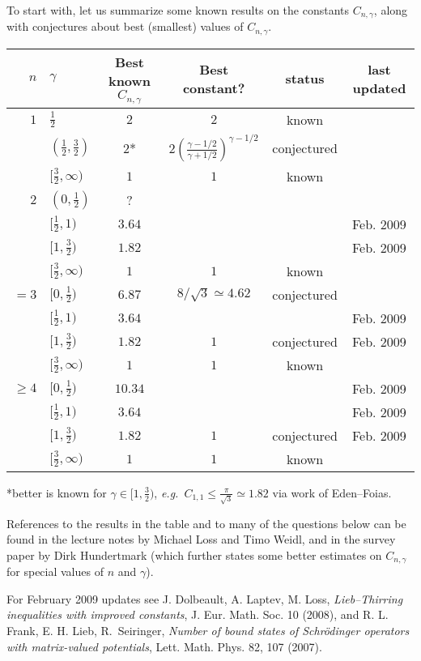 \documentclass[12pt,letterpaper, reqno]{aimpl}
\begin{document}
To start with, let us summarize some known results on the constants
$C_{n,\gamma}$, along with conjectures about best (smallest) values
of $C_{n,\gamma}$.
%
\begin{center}
%
\renewcommand{\arraystretch}{1.3}
\begin{tabular}[h]{|r|l|c|cc|c|}
\hline $n$ & $\gamma$ & Best known $C_{n,\gamma}$ & Best constant? & status & last updated\\
\hline \hline
$1$ & $\frac{1}{2}$ & $2$ & $2$ & known & \\
& $(\frac{1}{2},\frac{3}{2})$ & $2$* & $2 \! \left( \frac{\gamma - 1/2}{\gamma + 1/2} \right)^{\gamma - 1/2}$ & conjectured & \\
& $[\frac{3}{2},\infty)$ & $1$ & $1$ & known & \\
\hline
$2$ & $(0,\frac{1}{2})$ & ? & & &\\
& $[\frac{1}{2},1)$ & $3.64$ & & & Feb. 2009\\
& $[1,\frac{3}{2})$ & $1.82$ & & & Feb. 2009\\
& $[\frac{3}{2},\infty)$ & $1$ & $1$ & known &\\
\hline
$= 3$ & $[0,\frac{1}{2})$ & $6.87$ & $8/\sqrt{3}\simeq 4.62$ & conjectured &\\
& $[\frac{1}{2},1)$ & $3.64$ & & & Feb. 2009\\
& $[1,\frac{3}{2})$ & $1.82$ & $1$ & conjectured & Feb. 2009\\
& $[\frac{3}{2},\infty)$ & $1$ & $1$ & known & \\
\hline
$\geq 4$ & $[0,\frac{1}{2})$ & $10.34$ & & & Feb. 2009\\
& $[\frac{1}{2},1)$ & $3.64$ & & & Feb. 2009\\
& $[1,\frac{3}{2})$ & $1.82$ & $1$ & conjectured & Feb. 2009\\
& $[\frac{3}{2},\infty)$ & $1$ & $1$ & known & \\
\hline
\end{tabular}
%
\hspace*{0.5in} *better is known for $\gamma \in [1,\frac{3}{2})$,
\textit{e.g.}\ $C_{1,1} \leq \frac{\pi}{\sqrt{3}} \simeq 1.82$ via
work of Eden--Foias.
\end{center}
%
References to the results in the table and
to many of the questions below can be found in the lecture notes by
Michael Loss and Timo Weidl, and in the survey paper by Dirk
Hundertmark (which further states some better estimates on
$C_{n,\gamma}$ for special values of $n$ and $\gamma$).

For February 2009 updates see J. Dolbeault, A. Laptev, M. Loss, \emph{Lieb--Thirring inequalities with improved constants}, J. Eur. Math. Soc. 10 (2008), and R. L. Frank, E. H. Lieb, R.~Seiringer, \emph{Number of bound states of Schr\"odinger operators with matrix-valued potentials}, Lett. Math. Phys. 82, 107 (2007).
\end{document}

